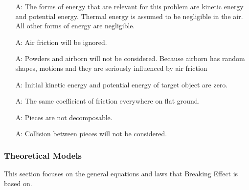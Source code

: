 \documentclass[12pt]{article}
\newcounter{assumpnum} %
\newcommand{\progname}{Breaking Effect} %
\begin{document}
\begin{itemize}

\item[A\refstepcounter{assumpnum}\theassumpnum \label{A_mechanical}:]
 The forms of energy that are relevant for this problem are kinetic energy and potential energy. Thermal energy is assumed to be negligible in the air. All other forms of energy are negligible.

\item[A\refstepcounter{assumpnum}\theassumpnum \label{A_airFriction}:]
Air friction will be ignored.

\item[A\refstepcounter{assumpnum}\theassumpnum \label{A_powder}:]
Powders and airborn will not be considered. Because airborn has random shapes, motions and they are seriously influenced by air friction

\item[A\refstepcounter{assumpnum}\theassumpnum \label{A_initialPE}:]
Initial kinetic energy and potential energy of target object are zero. 

\item[A\refstepcounter{assumpnum}\theassumpnum \label{A_ground}:]
The same coefficient of friction everywhere on flat ground.​

\item[A\refstepcounter{assumpnum}\theassumpnum \label{A_piece}:]
Pieces are not decomposable. 

\item[A\refstepcounter{assumpnum}\theassumpnum \label{A_collision}:]
Collision between pieces will not be considered. 

\end{itemize}

\subsubsection{Theoretical Models}\label{sec_theoretical}

This section focuses on the general equations and laws that \progname{} is based
on. 

~\newline
\end{document}
